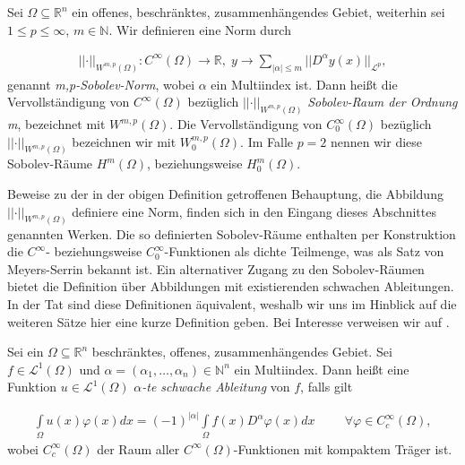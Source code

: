 \begin{defi}\label{Sobolevspace}
Sei $\Omega \subseteq \mathbb{R}^n$ ein offenes, beschränktes, zusammenhängendes Gebiet, weiterhin sei $1 \leq p \leq \infty$, $m \in \mathbb{N}$. Wir definieren eine Norm durch

\begin{align*}
	\vert\vert \cdot \vert\vert_{W^{m,p}(\Omega)}: C^\infty(\Omega) \rightarrow 
	\mathbb{R},\; y \rightarrow \underset{\vert \alpha \vert \leq m}{\sum} 						\vert\vert D^\alpha y(x) \vert\vert_{\mathcal{L}^p},
\end{align*}
genannt \textit{m,p-Sobolev-Norm}, wobei $\alpha$ ein Multiindex ist. Dann heißt die Vervollständigung von $C^\infty(\Omega)$ bezüglich $\vert\vert \cdot \vert\vert_{W^{m,p}(\Omega)}$ \textit{Sobolev-Raum der Ordnung m}, bezeichnet mit $W^{m,p}(\Omega)$. Die Vervollständigung von $C_0^\infty(\Omega)$ bezüglich $\vert\vert \cdot \vert\vert_{W^{m,p}(\Omega)}$ bezeichnen wir mit $W_0^{m,p}(\Omega)$. Im Falle $p=2$ nennen wir diese Sobolev-Räume $H^m(\Omega)$, beziehungsweise  $H_0^m(\Omega)$.
\end{defi}

Beweise zu der in der obigen Definition getroffenen Behauptung, die Abbildung $\vert\vert \cdot \vert\vert_{W^{m,p}(\Omega)}$ definiere eine Norm, finden sich in den Eingang dieses Abschnittes genannten Werken. Die so definierten Sobolev-Räume enthalten per Konstruktion die $C^\infty$- beziehungsweise $C_0^\infty$-Funktionen als dichte Teilmenge, was als Satz von Meyers-Serrin bekannt ist. Ein alternativer Zugang zu den Sobolev-Räumen bietet die Definition über Abbildungen mit existierenden schwachen Ableitungen. In der Tat sind diese Definitionen äquivalent, weshalb wir uns im Hinblick auf die weiteren Sätze hier eine kurze Definition geben. Bei Interesse verweisen wir auf \cite{PDE3}.

\begin{defi}
Sei ein $\Omega \subseteq \mathbb{R}^n$ beschränktes, offenes, zusammenhängendes Gebiet. Sei $f\in \mathcal{L}^1(\Omega)$ und $\alpha = (\alpha_1,\dots, \alpha_n)\in \mathbb{N}^n$ ein Multiindex. 
Dann heißt eine Funktion $u \in \mathcal{L}^1(\Omega)$ \textit{ $\alpha$-te schwache Ableitung} von $f$, falls gilt

\begin{align*}
	\underset{\Omega}{\int}u(x)\varphi(x)dx = (-1)^{\vert \alpha \vert}\underset{\Omega}{\int}f(x)D^\alpha\varphi(x)dx \hspace{1cm} \forall \varphi \in C_c^\infty(\Omega),
\end{align*}
wobei $C_c^\infty(\Omega)$ der Raum aller $C^\infty(\Omega)$-Funktionen mit kompaktem Träger ist.
\end{defi}

